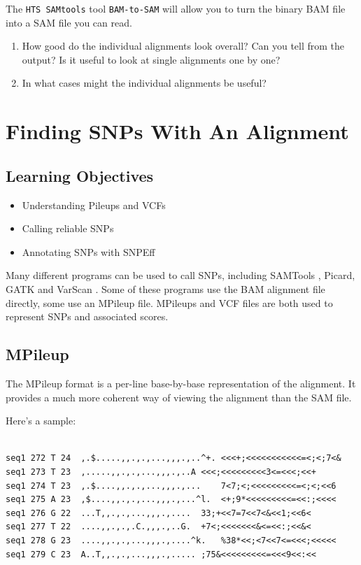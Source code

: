 \documentclass[12pt,]{book}
\providecommand{\tightlist}{%
  \setlength{\itemsep}{0pt}\setlength{\parskip}{0pt}}
\theoremstyle{definition}
\theoremstyle{definition}
\theoremstyle{remark}
\begin{document}
The \texttt{HTS\ SAMtools} tool \texttt{BAM-to-SAM} will allow you to
turn the binary BAM file into a SAM file you can read.

\begin{enumerate}
\def\labelenumi{\arabic{enumi}.}
\tightlist
\item
  How good do the individual alignments look overall? Can you tell from
  the output? Is it useful to look at single alignments one by one?
\item
  In what cases might the individual alignments be useful?
\end{enumerate}

\chapter{Finding SNPs With An
Alignment}\label{finding-snps-with-an-alignment}

\section{Learning Objectives}\label{learning-objectives-3}

\begin{itemize}
\tightlist
\item
  Understanding Pileups and VCFs
\item
  Calling reliable SNPs
\item
  Annotating SNPs with SNPEff
\end{itemize}

Many different programs can be used to call SNPs, including SAMTools
\citep{Li:2009ka}, Picard, GATK \citep{DeSumma:2017kr} and VarScan
\citep{Koboldt:2009dk}. Some of these programs use the BAM alignment
file directly, some use an MPileup file. MPileups and VCF files are both
used to represent SNPs and associated scores.

\section{MPileup}\label{mpileup}

The MPileup format is a per-line base-by-base representation of the
alignment. It provides a much more coherent way of viewing the alignment
than the SAM file.

Here's a sample:

\begin{verbatim}

seq1 272 T 24  ,.$.....,,.,.,...,,,.,..^+. <<<+;<<<<<<<<<<<=<;<;7<&
seq1 273 T 23  ,.....,,.,.,...,,,.,..A <<<;<<<<<<<<<3<=<<<;<<+
seq1 274 T 23  ,.$....,,.,.,...,,,.,...    7<7;<;<<<<<<<<<=<;<;<<6
seq1 275 A 23  ,$....,,.,.,...,,,.,...^l.  <+;9*<<<<<<<<<=<<:;<<<<
seq1 276 G 22  ...T,,.,.,...,,,.,....  33;+<<7=7<<7<&<<1;<<6<
seq1 277 T 22  ....,,.,.,.C.,,,.,..G.  +7<;<<<<<<<&<=<<:;<<&<
seq1 278 G 23  ....,,.,.,...,,,.,....^k.   %38*<<;<7<<7<=<<<;<<<<<
seq1 279 C 23  A..T,,.,.,...,,,.,..... ;75&<<<<<<<<<=<<<9<<:<<
\end{verbatim}
\end{document}
